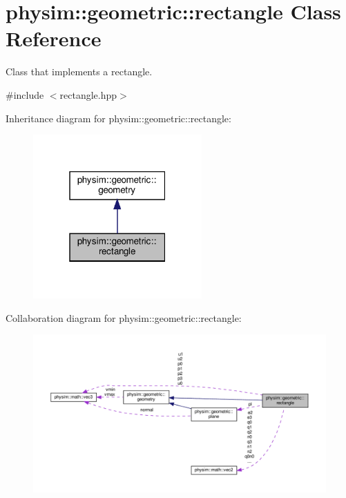 \hypertarget{classphysim_1_1geometric_1_1rectangle}{}\section{physim\+:\+:geometric\+:\+:rectangle Class Reference}
\label{classphysim_1_1geometric_1_1rectangle}


Class that implements a rectangle.  




{\ttfamily \#include $<$rectangle.\+hpp$>$}



Inheritance diagram for physim\+:\+:geometric\+:\+:rectangle\+:\nopagebreak
\begin{figure}[H]
\begin{center}
\leavevmode
\includegraphics[width=183pt]{classphysim_1_1geometric_1_1rectangle__inherit__graph}
\end{center}
\end{figure}


Collaboration diagram for physim\+:\+:geometric\+:\+:rectangle\+:\nopagebreak
\begin{figure}[H]
\begin{center}
\leavevmode
\includegraphics[width=350pt]{classphysim_1_1geometric_1_1rectangle__coll__graph}
\end{center}
\end{figure}
